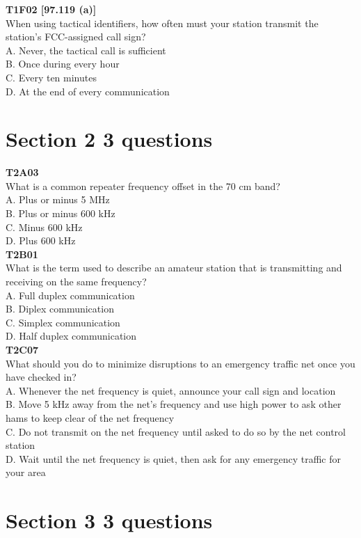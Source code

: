 \documentclass[12pt,letterpaper,twocolumn]{report}
\begin{document}
\textbf{T1F02 [97.119 (a)]}\\
When using tactical identifiers, how often must your station transmit the station's FCC-assigned call sign? \\
A. Never, the tactical call is sufficient\\
B. Once during every hour\\
C. Every ten minutes\\
D. At the end of every communication\\

\section{Section 2 3 questions}

\textbf{T2A03}\\
What is a common repeater frequency offset in the 70 cm band?\\
A. Plus or minus 5 MHz\\
B. Plus or minus 600 kHz\\
C. Minus 600 kHz\\
D. Plus 600 kHz\\

\textbf{T2B01}\\
What is the term used to describe an amateur station that is transmitting and receiving on the same frequency?\\
A. Full duplex communication\\
B. Diplex communication\\
C. Simplex communication\\
D. Half duplex communication\\

\textbf{T2C07}\\
What should you do to minimize disruptions to an emergency traffic net once you have checked in?\\
A. Whenever the net frequency is quiet, announce your call sign and location\\
B. Move 5 kHz away from the net's frequency and use high power to ask other hams to keep clear of the net frequency\\
C. Do not transmit on the net frequency until asked to do so by the net control station\\
D. Wait until the net frequency is quiet, then ask for any emergency traffic for your area \\

\section{Section 3 3 questions}
\end{document}
